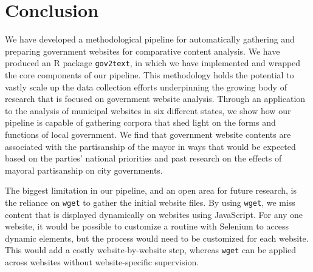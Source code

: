\documentclass[11pt]{article}
\begin{document}
\section{Conclusion}


We have developed a methodological pipeline for automatically gathering and preparing government websites for comparative content analysis. We have produced an R package \texttt{gov2text}, in which we have implemented and wrapped the core components of our pipeline. This methodology holds the potential to vastly scale up the data collection efforts underpinning the growing body of research that is focused on government website analysis. Through an application to the analysis of municipal websites in six different states, we show how our pipeline is capable of gathering corpora that shed light on the forms and functions of local government. We find that government website contents are associated with the partisanship of the mayor in ways that would be expected based on the parties' national priorities and past research on the effects of mayoral partisanship on city governments.

The biggest limitation in our pipeline, and an open area for future research, is the reliance on \texttt{wget} to gather the initial website files. By using \texttt{wget}, we miss content that is displayed dynamically on websites using JavaScript. For any one website, it would be possible to customize a routine with Selenium to access dynamic elements, but the process would need to be customized for each website. This would add a costly website-by-website step, whereas \texttt{wget} can be applied across websites without website-specific supervision. 

\end{document}
